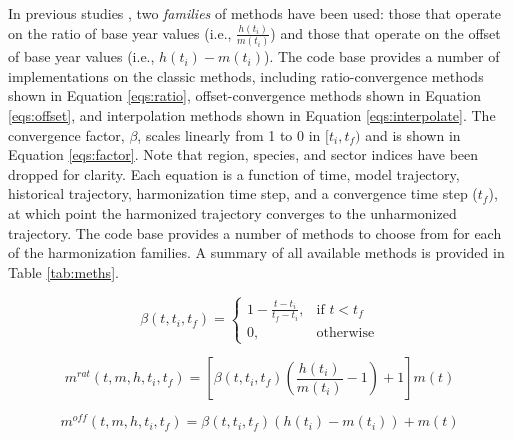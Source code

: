 In previous studies \cite{meinshausen_rcp_2011,rogelj_discrepancies_2011}, two
\textit{families} of methods have been used: those that operate on the ratio of
base year values (i.e., $\frac{h(t_i)}{m(t_i)}$) and those that operate on the
offset of base year values (i.e., $h(t_i) - m(t_i)$). The  code
base provides a number of implementations on the classic methods, including
% 
% 
ratio-convergence methods shown in Equation \ref{eqs:ratio}, offset-convergence
methods shown in Equation \ref{eqs:offset}, and interpolation methods shown in
Equation \ref{eqs:interpolate}. The convergence factor, $\beta$, scales linearly
from 1 to 0 in $[t_i, t_f)$ and is shown in Equation \ref{eqs:factor}. Note
that region, species, and sector indices have been dropped for clarity. Each
equation is a function of time, model trajectory, historical trajectory,
harmonization time step, and a convergence time step ($t_f$), at which point the
harmonized trajectory converges to the unharmonized trajectory. The
 code base provides a number of methods to choose from for each of
the harmonization families. A summary of all available methods is provided in
Table \ref{tab:meths}.
% 
% 


\begin{equation}\label{eqs:factor}
  \beta(t, t_i, t_f) =
  \begin{cases}
    1 - \frac{t - t_i}{t_f - t_i},& \text{if } t < t_f\\
    0,                        & \text{otherwise}
  \end{cases}
\end{equation}

\begin{equation}\label{eqs:ratio}
  m^{rat}(t, m, h, t_i, t_f) = [\beta(t, t_i, t_f) (\frac{h(t_i)}{m(t_i)} - 1) + 1] m(t)
\end{equation}

\begin{equation}\label{eqs:offset}
  m^{off}(t, m, h, t_i, t_f) = \beta(t, t_i, t_f) (h(t_i) - m(t_i)) + m(t)
\end{equation}
  
